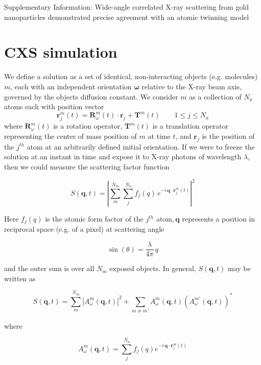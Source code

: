 \documentclass [12pt,fleqn]{article}
\def \be {\begin{equation}}
\def \ee {\end{equation}}
\begin{document}
\newpage

\large{Supplementary Information: Wide-angle correlated X-ray scattering from gold nanoparticles demonstrated precise agreement with an atomic twinning model}

\setcounter{equation}{0}
\setcounter{figure}{0}
\setcounter{table}{0}
\setcounter{section}{0}
\setcounter{page}{1}
\makeatletter
\renewcommand{\theequation}{S\arabic{equation}}
\renewcommand{\thefigure}{S\arabic{figure}}
\renewcommand{\thesection}{S\arabic{section}}

\section{CXS simulation} \label{supp:sim}
We define a solution as a set of identical, non-interacting objects (e.g. molecules) $m$, each with an independent orientation $\bm \omega$ relative to the X-ray beam axis, governed by the objects diffusion constant. We consider $m$ as a collection of $N_a$ atoms each with position vector 
\be
\bm r^m_j (t) = \bm R^m_\omega (t)\cdot \bm r_j + \bm T^m(t) \qquad 1 \le j \le N_a
\ee 
where $\bm R^m_\omega(t)$ is a rotation operator, $\bm T^m (t)$ is a translation operator representing the center of mass position of $m$ at time $t$, and $\bm r_j$ is the position of the $j^{th}$ atom at an arbitrarily defined initial orientation. If we were to freeze the solution at an instant in time and expose it to X-ray photons of wavelength $\lambda$, then we could measure the scattering factor function

\be
S(\bm q, t) = \left | \sum_m^{N_m} \sum_{j}^{N_a} f_j(q) \,e ^ { -i \,\bm q \cdot \bm  r^m _j (t)  } \right |^2
\ee

Here $f_j(q)$ is the atomic form factor of the $j^{th}$ atom$, \bm q$ represents a position in reciprocal space (e.g. of a pixel) at scattering angle  

\be \label{angle}
\sin(\theta) = \frac{ \lambda }{ 4 \pi}\,q
\ee

and the outer sum is over all $N_m$ exposed objects. In general, $S(\bm q, t)$ may be written as

\be \label{ sums }
S( \bm q, t) = \sum_m^{N_m} \left | A^m_\omega (\bm q ,t ) \right|^2 + \sum _{ m \neq m' } A^m_\omega (\bm q,t ) \left (A^{m'}_\omega (\bm q,t ) \right )^*
\ee

where 

\be
A^m_\omega (\bm q,t ) = \sum_{j}^{N_a} f_j(q) e^{ -i \,\bm q \cdot \bm  r^m_j (t)  }
\ee
\end{document}
